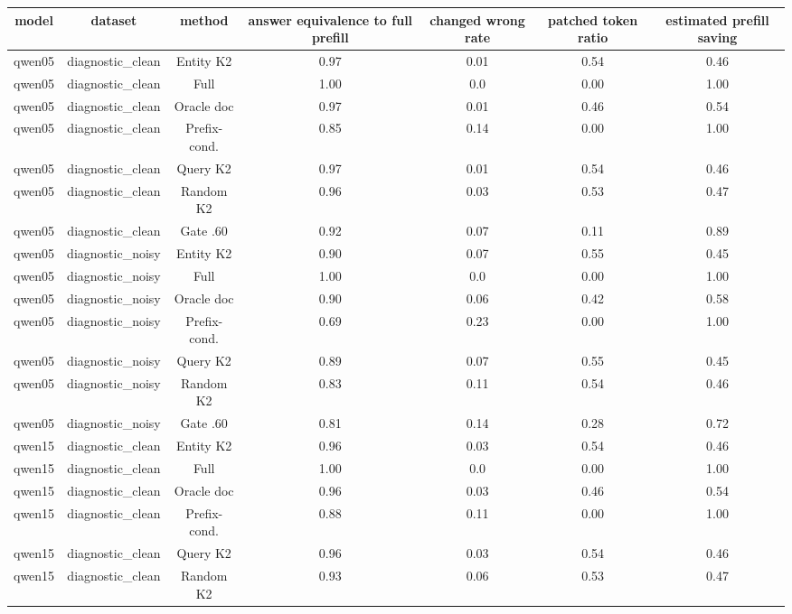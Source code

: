 \begin{table}[t]
\centering
\footnotesize
\begin{adjustbox}{max width=\textwidth}
\begin{tabular}{ccccccc}
\toprule
model & dataset & method & answer equivalence to full prefill & changed wrong rate & patched token ratio & estimated prefill saving \\
\midrule
qwen05 & diagnostic\_clean & Entity K2 & 0.97 & 0.01 & 0.54 & 0.46 \\
qwen05 & diagnostic\_clean & Full & 1.00 & 0.0 & 0.00 & 1.00 \\
qwen05 & diagnostic\_clean & Oracle doc & 0.97 & 0.01 & 0.46 & 0.54 \\
qwen05 & diagnostic\_clean & Prefix-cond. & 0.85 & 0.14 & 0.00 & 1.00 \\
qwen05 & diagnostic\_clean & Query K2 & 0.97 & 0.01 & 0.54 & 0.46 \\
qwen05 & diagnostic\_clean & Random K2 & 0.96 & 0.03 & 0.53 & 0.47 \\
qwen05 & diagnostic\_clean & Gate .60 & 0.92 & 0.07 & 0.11 & 0.89 \\
qwen05 & diagnostic\_noisy & Entity K2 & 0.90 & 0.07 & 0.55 & 0.45 \\
qwen05 & diagnostic\_noisy & Full & 1.00 & 0.0 & 0.00 & 1.00 \\
qwen05 & diagnostic\_noisy & Oracle doc & 0.90 & 0.06 & 0.42 & 0.58 \\
qwen05 & diagnostic\_noisy & Prefix-cond. & 0.69 & 0.23 & 0.00 & 1.00 \\
qwen05 & diagnostic\_noisy & Query K2 & 0.89 & 0.07 & 0.55 & 0.45 \\
qwen05 & diagnostic\_noisy & Random K2 & 0.83 & 0.11 & 0.54 & 0.46 \\
qwen05 & diagnostic\_noisy & Gate .60 & 0.81 & 0.14 & 0.28 & 0.72 \\
qwen15 & diagnostic\_clean & Entity K2 & 0.96 & 0.03 & 0.54 & 0.46 \\
qwen15 & diagnostic\_clean & Full & 1.00 & 0.0 & 0.00 & 1.00 \\
qwen15 & diagnostic\_clean & Oracle doc & 0.96 & 0.03 & 0.46 & 0.54 \\
qwen15 & diagnostic\_clean & Prefix-cond. & 0.88 & 0.11 & 0.00 & 1.00 \\
qwen15 & diagnostic\_clean & Query K2 & 0.96 & 0.03 & 0.54 & 0.46 \\
qwen15 & diagnostic\_clean & Random K2 & 0.93 & 0.06 & 0.53 & 0.47 \\

\end{tabular}
\end{adjustbox}
\end{table}
